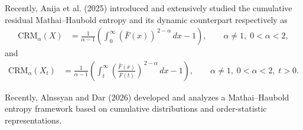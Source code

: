 \documentclass[11pt,reqno]{amsart}
\theoremstyle{tight}
\begin{document}
 Recently, Anija et al. (2025) introduced and extensively studied the cumulative residual Mathai--Haubold entropy and its dynamic counterpart respectively as
\begin{align}\label{CRM}
\mathrm{CRM}_{\alpha}(X)
&=
\frac{1}{\alpha-1}
\left(
\int_{0}^{\infty}
(\bar{F}(x))^{\,2-\alpha}\,dx
-1
\right),
\qquad
\alpha \neq 1,\; 0<\alpha<2,
\end{align}
and
\begin{align}\label{CRMt}
\mathrm{CRM}_{\alpha}(X_t)
&=
\frac{1}{\alpha-1}
\left(
\int_{t}^{\infty}
\left(
\frac{\bar{F}(x)}{\bar{F}(t)}
\right)^{\,2-\alpha}
\,dx
-1
\right),
\qquad
\alpha \neq 1,\; 0<\alpha<2,\; t>0.
\end{align}


Recently, Alnssyan and Dar (2026)  developed and analyzes a Mathai–Haubold entropy framework based on cumulative distributions and order-statistic representations.
\end{document}
